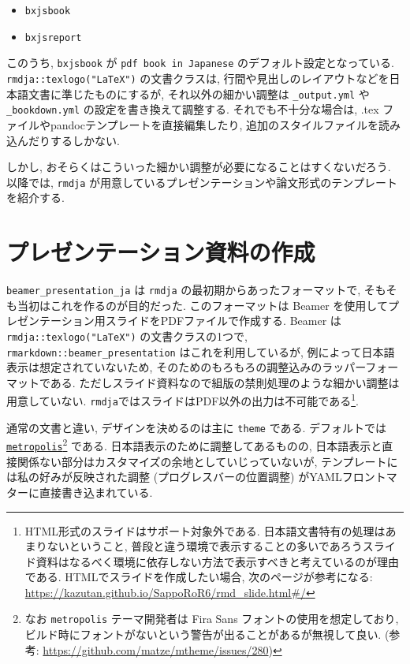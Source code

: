 \documentclass[
  xelatex,ja=standard,jafont=noto]{bxjsbook}
\providecommand{\tightlist}{%
  \setlength{\itemsep}{0pt}\setlength{\parskip}{0pt}}
\theoremstyle{definition}
\theoremstyle{definition}
\theoremstyle{definition}
\theoremstyle{definition}
\theoremstyle{remark}
\begin{document}
\begin{itemize}
\tightlist
\item
  \texttt{bxjsbook}
\item
  \texttt{bxjsreport}
\end{itemize}

このうち, \texttt{bxjsbook} が \texttt{pdf\ book\ in\ Japanese}
のデフォルト設定となっている. \texttt{rmdja::texlogo("LaTeX")}
の文書クラスは,
行間や見出しのレイアウトなどを日本語文書に準じたものにするが,
それ以外の細かい調整は \texttt{\_output.yml} や \texttt{\_bookdown.yml}
の設定を書き換えて調整する. それでも不十分な場合は, .tex
ファイルやpandocテンプレートを直接編集したり,
追加のスタイルファイルを読み込んだりするしかない.

しかし, おそらくはこういった細かい調整が必要になることはすくないだろう.
以降では, \texttt{rmdja}
が用意しているプレゼンテーションや論文形式のテンプレートを紹介する.

\hypertarget{ux30d7ux30ecux30bcux30f3ux30c6ux30fcux30b7ux30e7ux30f3ux8cc7ux6599ux306eux4f5cux6210}{%
\section{プレゼンテーション資料の作成}\label{ux30d7ux30ecux30bcux30f3ux30c6ux30fcux30b7ux30e7ux30f3ux8cc7ux6599ux306eux4f5cux6210}}

\texttt{beamer\_presentation\_ja} は \texttt{rmdja}
の最初期からあったフォーマットで,
そもそも当初はこれを作るのが目的だった. このフォーマットは Beamer
を使用してプレゼンテーション用スライドをPDFファイルで作成する. Beamer は
\texttt{rmdja::texlogo("LaTeX")} の文書クラスの1つで,
\texttt{rmarkdown::beamer\_presentation} はこれを利用しているが,
例によって日本語表示は想定されていないため,
そのためのもろもろの調整込みのラッパーフォーマットである.
ただしスライド資料なので組版の禁則処理のような細かい調整は用意していない.
\texttt{rmdja}ではスライドはPDF以外の出力は不可能である\footnote{HTML形式のスライドはサポート対象外である.
  日本語文書特有の処理はあまりないということ,
  普段と違う環境で表示することの多いであろうスライド資料はなるべく環境に依存しない方法で表示すべきと考えているのが理由である.
  HTMLでスライドを作成したい場合, 次のページが参考になる:
  \url{https://kazutan.github.io/SappoRoR6/rmd_slide.html\#/}}.

通常の文書と違い, デザインを決めるのは主に \texttt{theme} である.
デフォルトでは
\href{https://github.com/matze/mtheme}{\texttt{metropolis}}\footnote{なお
  \texttt{metropolis} テーマ開発者は Fira Sans
  フォントの使用を想定しており,
  ビルド時にフォントがないという警告が出ることがあるが無視して良い.
  (参考: \url{https://github.com/matze/mtheme/issues/280})} である.
日本語表示のために調整してあるものの,
日本語表示と直接関係ない部分はカスタマイズの余地としていじっていないが,
テンプレートには私の好みが反映された調整 (プログレスバーの位置調整)
がYAMLフロントマターに直接書き込まれている.
\end{document}
